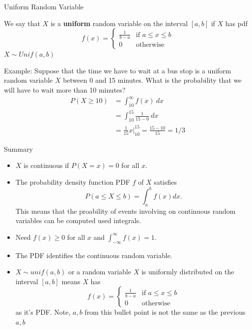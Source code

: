 \documentclass[handout]{beamer}
\begin{document}
            \begin{frame}{Uniform Random Variable}
            \begin{block}{}
            We say that $X$ is a \textbf{uniform} random variable on the interval $[a,b]$ if $X$ has pdf
            $$f(x)=\begin{cases}\frac1{b-a} & \text{if }a\leq x\leq b \\
            0 & \text{otherwise}\end{cases}$$
            $X\sim Unif(a,b)$
            \end{block}
            \pause Example: Suppose that the time we have to wait at a bus stop is a uniform random variable $X$ between 0 and 15 minutes. What is the probability that we will have to wait more than 10 minutes?
            \pause \begin{align*}
            P(X\geq 10) &= \int_{10}^\infty f(x)\ dx \\
            &= \int_{10}^{15} \frac1{15-0}\ dx \\
            &= \frac1{15}x\big\vert_{10}^{15} = \frac{15-10}{15} = 1/3
            \end{align*}
            \end{frame}
    \begin{frame}{Summary}
        \begin{itemize}
            \item $X$ is continuous if $P(X=x) =0$ for all $x$.
            \item The probability density function PDF $f$ of $X$ satisfies
            $$ P(a \leq X \leq b) = \int_{a}^b f(x) dx.$$
            This means that the proability of events involving on continuous random variables can be computed used integrals.
            \item Need $f(x)\geq 0$ for all $x$ and $\int_{-\infty}^{\infty} f(x)=1$.
            \item The PDF identifies the continuous random variable.
            \item $X \sim unif(a,b)$ or a random variable $X$ is uniformly distributed on the interval $[a,b]$ means $X$ has 
            $$f(x)=\begin{cases}\frac1{b-a} & \text{if }a\leq x\leq b \\
            0 & \text{otherwise}\end{cases}$$
            as it's PDF. Note, $a,b$ from this bullet point is not the same as the previous $a,b$
        \end{itemize}
    \end{frame}
\end{document}
